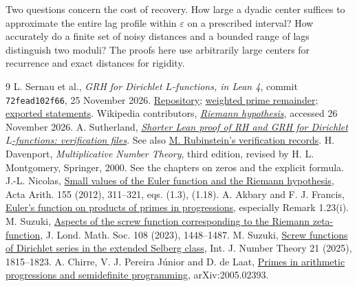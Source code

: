\documentclass[11pt]{article}
\begin{document}
Two questions concern the cost of recovery. How large a dyadic center suffices to approximate the entire lag profile within $\varepsilon$ on a prescribed interval? How accurately do a finite set of noisy distances and a bounded range of lags distinguish two moduli? The proofs here use arbitrarily large centers for recurrence and exact distances for rigidity.
\begin{thebibliography}{9}\small
{} L. Sernau et al., \emph{GRH for Dirichlet $L$-functions, in Lean 4}, commit \texttt{72fead102f66}, 25 November 2026. \href{https://github.com/lsernau/grh-lean/tree/72fead102f663d5c7a407964a13dc0cf9d977207}{Repository}; \href{https://github.com/lsernau/grh-lean/blob/72fead102f663d5c7a407964a13dc0cf9d977207/grh/src/New/Reduction/Zeros/PrimeError.lean}{weighted prime remainder}; \href{https://github.com/lsernau/grh-lean/blob/72fead102f663d5c7a407964a13dc0cf9d977207/grh/src/Main.lean}{exported statements}.
 Wikipedia contributors, \href{https://en.wikipedia.org/wiki/Riemann_hypothesis}{\emph{Riemann hypothesis}}, accessed 26 November 2026.
 A. Sutherland, \href{https://math.mit.edu/~drew/shortgrh/}{\emph{Shorter Lean proof of RH and GRH for Dirichlet $L$-functions: verification files}}. See also \href{https://www.math.uwaterloo.ca/~mrubinst/alpoge_claude_grh/}{M. Rubinstein's verification records}.
 H. Davenport, \emph{Multiplicative Number Theory}, third edition, revised by H. L. Montgomery, Springer, 2000. See the chapters on zeros and the explicit formula.
 J.-L. Nicolas, \href{https://doi.org/10.4064/aa155-3-7}{Small values of the Euler function and the Riemann hypothesis}, Acta Arith. 155 (2012), 311--321, eqs. (1.3), (1.18).
 A. Akbary and F. J. Francis, \href{https://arxiv.org/abs/1810.11524}{Euler's function on products of primes in progressions}, especially Remark 1.23(i).
 M. Suzuki, \href{https://doi.org/10.1112/jlms.12785}{Aspects of the screw function corresponding to the Riemann zeta-function}, J. Lond. Math. Soc. 108 (2023), 1448--1487.
 M. Suzuki, \href{https://arxiv.org/abs/2209.12832}{Screw functions of Dirichlet series in the extended Selberg class}, Int. J. Number Theory 21 (2025), 1815--1823.
 A. Chirre, V. J. Pereira J\'unior and D. de Laat, \href{https://arxiv.org/abs/2005.02393}{Primes in arithmetic progressions and semidefinite programming}, arXiv:2005.02393.
\end{thebibliography}
\end{document}
